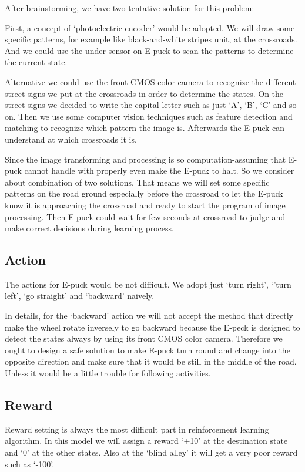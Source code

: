 \documentclass[
11pt, %
a4paper, %
oneside, %
headinclude%
BCOR3mm, %
]{scrartcl}
\begin{document}
After brainstorming, we have two tentative solution for this problem:


First, a concept of ‘photoelectric encoder’ would be adopted. 
We will draw some specific patterns, for example like black-and-white stripes unit, at the crossroads. And we could use the under sensor on E-puck to scan the patterns to determine the current state. 


Alternative we could use the front CMOS color camera to recognize the different street signs we put at the crossroads in order to determine the states. 
On the street signs we decided to write the capital letter such as just ‘A’, ‘B’, ‘C’ and so on. 
Then we use some computer vision techniques such as feature detection and matching to recognize which pattern the image is. 
Afterwards the E-puck can understand at which crossroads it is.


Since the image transforming and processing is so computation-assuming that E-puck cannot handle with properly even make the E-puck to halt. 
So we consider about combination of two solutions. 
That means we will set some specific patterns on the road ground especially before the crossroad to let the E-puck know it is approaching the crossroad and ready to start the program of image processing. 
Then E-puck could wait for few seconds at crossroad to judge and make correct decisions during learning process.

\subsection{Action}
The actions for E-puck would be not difficult. We adopt just ‘turn right’, ‘’turn left’, ‘go straight’ and ‘backward’ naively. 


In details, for the ‘backward’ action we will not accept the method that directly make the wheel rotate inversely to go backward because the E-peck is designed to detect the states always by using its front CMOS color camera. 
Therefore we ought to design a safe solution to make E-puck turn round and change into the opposite direction and make sure that it would be still in the middle of the road. Unless it would be a little trouble for following activities.

\subsection{Reward}
Reward setting is always the most difficult part in reinforcement learning algorithm. 
In this model we will assign a reward ‘+10’ at the destination state and ‘0’ at the other states. 
Also at the ‘blind alley’ it will get a very poor reward such as ‘-100’.
\end{document}

